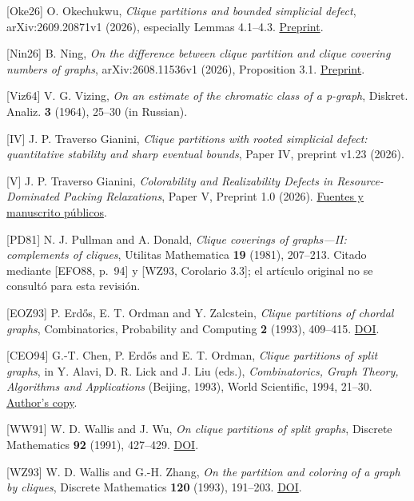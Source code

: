 \documentclass[spanish,11pt,a4paper]{article}
\begin{document}
{[}Oke26{]} O. Okechukwu, \emph{Clique partitions and bounded simplicial
defect}, arXiv:2609.20871v1 (2026), especially Lemmas 4.1--4.3.
\href{https://arxiv.org/html/2609.20871v1}{Preprint}.

{[}Nin26{]} B. Ning, \emph{On the difference between clique partition
and clique covering numbers of graphs}, arXiv:2608.11536v1 (2026),
Proposition 3.1. \href{https://arxiv.org/html/2608.11536v1}{Preprint}.

{[}Viz64{]} V. G. Vizing, \emph{On an estimate of the chromatic class of
a p-graph}, Diskret. Analiz. \textbf{3} (1964), 25--30 (in Russian).

{[}IV{]} J. P. Traverso Gianini, \emph{Clique partitions with rooted
simplicial defect: quantitative stability and sharp eventual bounds},
Paper IV, preprint v1.23 (2026).

{[}V{]} J. P. Traverso Gianini, \emph{Colorability and Realizability
Defects in Resource-Dominated Packing Relaxations}, Paper V, Preprint
1.0 (2026).
\href{https://github.com/jtraverso/erdos-81-chordal-clique-partitions/tree/main/preprints/PAPER_V}{Fuentes
y manuscrito públicos}.

{[}PD81{]} N. J. Pullman and A. Donald, \emph{Clique coverings of
graphs---II: complements of cliques}, Utilitas Mathematica \textbf{19}
(1981), 207--213. Citado mediante {[}EFO88, p.~94{]} y {[}WZ93,
Corolario 3.3{]}; el artículo original no se consultó para esta
revisión.

{[}EOZ93{]} P. Erdős, E. T. Ordman and Y. Zalcstein, \emph{Clique
partitions of chordal graphs}, Combinatorics, Probability and Computing
\textbf{2} (1993), 409--415.
\href{https://doi.org/10.1017/S0963548300000808}{DOI}.

{[}CEO94{]} G.-T. Chen, P. Erdős and E. T. Ordman, \emph{Clique
partitions of split graphs}, in Y. Alavi, D. R. Lick and J. Liu (eds.),
\emph{Combinatorics, Graph Theory, Algorithms and Applications}
(Beijing, 1993), World Scientific, 1994, 21--30.
\href{http://ordman.net/MathResearch/CEOClique_Parts.pdf}{Author's
copy}.

{[}WW91{]} W. D. Wallis and J. Wu, \emph{On clique partitions of split
graphs}, Discrete Mathematics \textbf{92} (1991), 427--429.
\href{https://doi.org/10.1016/0012-365X(91)90297-F}{DOI}.

{[}WZ93{]} W. D. Wallis and G.-H. Zhang, \emph{On the partition and
coloring of a graph by cliques}, Discrete Mathematics \textbf{120}
(1993), 191--203.
\href{https://doi.org/10.1016/0012-365X(93)90576-F}{DOI}.
\end{document}
